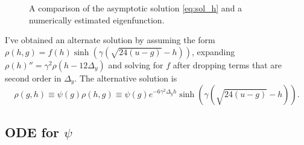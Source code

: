 \documentclass[twocolumn]{article}
\begin{document}
\begin{figure}
  \centering
    \caption{A comparison of the asymptotic solution \eqref{eq:sol_h}
      and a numerically estimated eigenfunction.}
  \label{fig:compare}
\end{figure}

\newcommand{\altphiHG}[2]{e^{-6\gamma^2 \Delta_y h} \sinh \left( \gamma
    \left( \sqrt{24(u-#2)} - #1 \right) \right)} I've obtained an
alternate solution by assuming the form $\rho(h,g) = f(h) \sinh\left(
  \gamma \left( \sqrt{24(u-g)} - h \right) \right)$, expanding
$\rho(h)'' = \gamma^2 \rho(h - 12\Delta_y)$ and solving for $f$ after
dropping terms that are second order in $\Delta_y$.  The alternative
solution is
\begin{equation}
  \label{eq:sol_h_}
  \rho(g,h) \equiv \psi(g) \rho(h,g) \equiv \psi(g) \altphiHG{h}{g}.  
\end{equation}

\subsection{ODE for $\psi$}
\label{sec:ODE}
\end{document}
